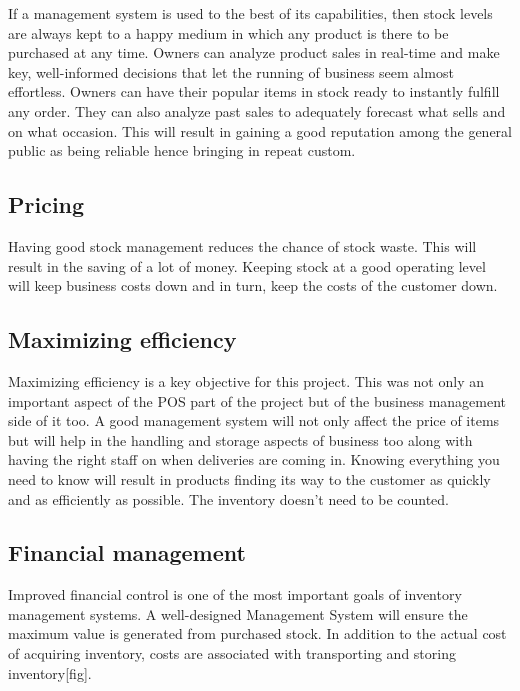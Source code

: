 If a management system is used to the best of its capabilities, then stock levels are always kept to a happy medium in which any product is there to be purchased at any time. Owners can analyze product sales in real-time and make key, well-informed decisions that let the running of business seem almost effortless. Owners can have their popular items in stock ready to instantly fulfill any order. They can also analyze past sales to adequately forecast what sells and on what occasion. This will result in gaining a good reputation among the general public as being reliable hence bringing in repeat custom.

\subsection{Pricing}

Having good stock management reduces the chance of stock waste. This will result in the saving of a lot of money. Keeping stock at a good operating level will keep business costs down and in turn, keep the costs of the customer down. 

\subsection{Maximizing efficiency}

Maximizing efficiency is a key objective for this project. This was not only an important aspect of the POS part of the project but of the business management side of it too. A good management system will not only affect the price of items but will help in the handling and storage aspects of business too along with having the right staff on when deliveries are coming in. Knowing everything you need to know will result in products finding its way to the customer as quickly and as efficiently as possible. The inventory doesn’t need to be counted.

\subsection{Financial management}

Improved financial control is one of the most important goals of inventory management systems. A well-designed Management System will ensure the maximum value is generated from purchased stock. In addition to the actual cost of acquiring inventory, costs are associated with transporting and storing inventory[fig].

